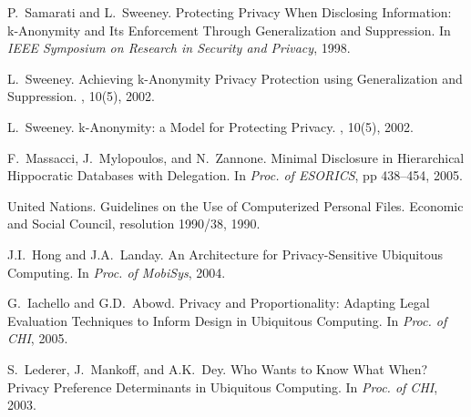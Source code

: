 \begin{thebibliography}{AH89}
P.~Samarati and L.~Sweeney.
\newblock Protecting Privacy When Disclosing Information: k-Anonymity and Its Enforcement Through
Generalization and Suppression.
\newblock In {\em IEEE Symposium on Research in Security and Privacy}, 1998.

L.~Sweeney.
\newblock Achieving k-Anonymity Privacy Protection using Generalization and Suppression.
, 10(5), 2002.

L.~Sweeney.
\newblock k-Anonymity: a Model for Protecting Privacy.
, 10(5), 2002.

F.~Massacci, J.~Mylopoulos, and N.~Zannone.
\newblock Minimal Disclosure in Hierarchical Hippocratic Databases with Delegation.
\newblock In {\em Proc. of ESORICS}, pp 438--454, 2005.


United Nations.
\newblock Guidelines on the Use of Computerized Personal Files.
\newblock Economic and Social Council, resolution 1990/38, 1990.

J.I.~Hong and J.A.~Landay.
\newblock An Architecture for Privacy-Sensitive Ubiquitous Computing.
\newblock In {\em Proc. of MobiSys}, 2004.

G.~Iachello and G.D.~Abowd.
\newblock Privacy and Proportionality: Adapting Legal Evaluation Techniques to Inform
Design in Ubiquitous Computing.
\newblock In {\em Proc. of CHI}, 2005.

S.~Lederer, J.~Mankoff, and A.K.~Dey.
\newblock Who Wants to Know What When? Privacy Preference Determinants in Ubiquitous Computing.
\newblock In {\em Proc. of CHI}, 2003.




\end{thebibliography}
